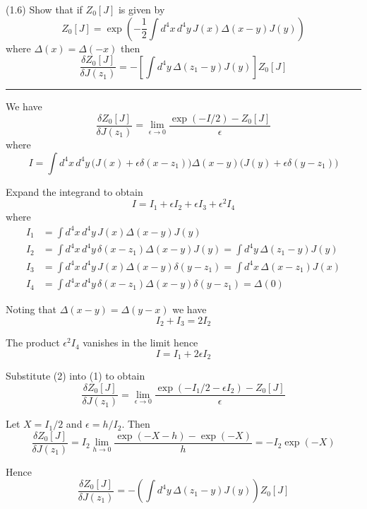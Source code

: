 \documentclass[12pt]{article}
\begin{document}
(1.6)
Show that if $Z_0[J]$ is given by
\begin{equation*}
Z_0[J]=\exp\left(
-\frac{1}{2}\int d^4x\,d^4y\,J(x)\Delta(x-y)J(y)
\right)
\tag{1.49}
\end{equation*}
where $\Delta(x)=\Delta(-x)$ then
\begin{equation*}
\frac{\delta Z_0[J]}{\delta J(z_1)}
=-\left[
\int d^4y\,\Delta(z_1-y)J(y)
\right]Z_0[J]
\tag{1.50}
\end{equation*}

\bigskip
\hrule

\bigskip
We have
\begin{equation*}
\frac{\delta Z_0[J]}{\delta J(z_1)}=\lim_{\epsilon\rightarrow0}
\frac{\exp(-I/2)-Z_0[J]}{\epsilon}
\tag{1}
\end{equation*}
where
\begin{equation*}
I=\int d^4x\,d^4y\,
\big(J(x)+\epsilon\delta(x-z_1)\big)
\Delta(x-y)
\big(J(y)+\epsilon\delta(y-z_1)\big)
\end{equation*}

Expand the integrand to obtain
\begin{equation*}
I=I_1+\epsilon I_2+\epsilon I_3+\epsilon^2 I_4
\end{equation*}
where
\begin{align*}
I_1&=\int d^4x\,d^4y\,J(x)\Delta(x-y)J(y)
\\
I_2&=\int d^4x\,d^4y\,\delta(x-z_1)\Delta(x-y)J(y)=\int d^4y\,\Delta(z_1-y)J(y)
\\
I_3&=\int d^4x\,d^4y\,J(x)\Delta(x-y)\delta(y-z_1)=\int d^4x\,\Delta(x-z_1)J(x)
\\
I_4&=\int d^4x\,d^4y\,\delta(x-z_1)\Delta(x-y)\delta(y-z_1)=\Delta(0)
\end{align*}

Noting that $\Delta(x-y)=\Delta(y-x)$ we have
\begin{equation*}
I_2+I_3=2I_2
\end{equation*}

The product $\epsilon^2I_4$ vanishes in the limit hence
\begin{equation*}
I=I_1+2\epsilon I_2
\tag{2}
\end{equation*}

Substitute (2) into (1) to obtain
\begin{equation*}
\frac{\delta Z_0[J]}{\delta J(z_1)}=\lim_{\epsilon\rightarrow0}
\frac{\exp(-I_1/2-\epsilon I_2)-Z_0[J]}{\epsilon}
\end{equation*}

Let $X=I_1/2$ and $\epsilon=h/I_2$.
Then
\begin{equation*}
\frac{\delta Z_0[J]}{\delta J(z_1)}=I_2\lim_{h\rightarrow0}
\frac{\exp(-X-h)-\exp(-X)}{h}
=-I_2\exp(-X)
\end{equation*}

Hence
\begin{equation*}
\frac{\delta Z_0[J]}{\delta J(z_1)}=-\left(\int d^4y\,\Delta(z_1-y)J(y)\right)Z_0[J]
\end{equation*}
\end{document}
